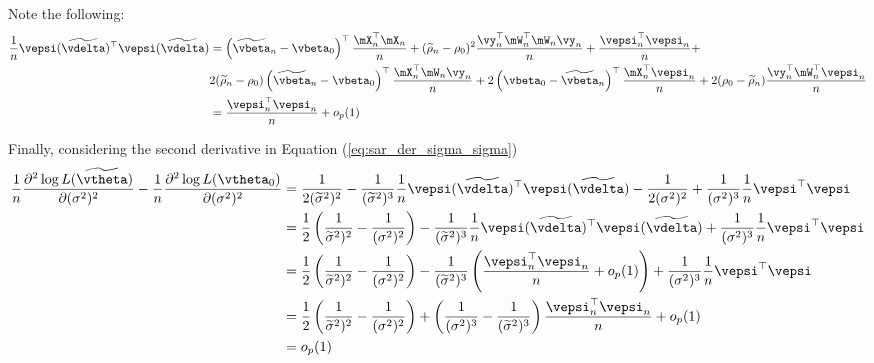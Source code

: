 \documentclass[english,12pt]{book}\usepackage[]{graphicx}\usepackage[]{xcolor}
\begin{document}
\begin{subappendices}
\begin{enumerate}
    Note the following:
   \begin{equation*}
    \begin{aligned}
    \frac{1}{n}\vepsi(\widetilde{\vdelta})^\top \vepsi(\widetilde{\vdelta}) & = \left(\widetilde{\vbeta}_n - \vbeta_0\right)^\top\frac{\mX_n^\top\mX_n}{n} + (\widetilde{\rho}_n -\rho_0)^2\frac{\vy_n^\top\mW_n^\top\mW_n\vy_n}{n} + \frac{\vepsi_n^{\top}\vepsi_n}{n} + \\
    & 2(\widetilde{\rho}_n -\rho_0)\left(\widetilde{\vbeta}_n - \vbeta_0\right)^\top\frac{\mX_n^\top\mW_n\vy_n}{n} + 2\left(\vbeta_0-\widetilde{\vbeta}_n\right)^\top\frac{\mX_n^\top\vepsi_n}{n} + 2(\rho_0-\widetilde{\rho}_n)\frac{\vy_n^\top\mW_n^\top\vepsi_n}{n} \\
    & = \frac{\vepsi_n^{\top}\vepsi_n}{n} + o_p(1)
    \end{aligned}
   \end{equation*}
   
   
   Finally, considering the second derivative in Equation (\ref{eq:sar_der_sigma_sigma})
   \begin{equation*}
    \begin{aligned}
      \frac{1}{n}\frac{\partial^2 \log L(\widetilde{\vtheta})}{\partial (\sigma^2)^2} -	\frac{1}{n}\frac{\partial^2 \log L(\vtheta_0)}{\partial (\sigma^2)^2}  & = \frac{1}{2(\widetilde{\sigma}^2) ^2} - \frac{1}{(\widetilde{\sigma}^2)^3} \frac{1}{n}\vepsi(\widetilde{\vdelta})^\top \vepsi(\widetilde{\vdelta}) -\frac{1}{2(\sigma^2) ^2} + \frac{1}{(\sigma^2)^3} \frac{1}{n}\vepsi^\top \vepsi \\
      & = \frac{1}{2}\left(\frac{1}{\widetilde{\sigma}^2) ^2}-\frac{1}{(\sigma^2) ^2}\right)- \frac{1}{(\widetilde{\sigma}^2)^3} \frac{1}{n}\vepsi(\widetilde{\vdelta})^\top \vepsi(\widetilde{\vdelta}) + \frac{1}{(\sigma^2)^3} \frac{1}{n}\vepsi^\top \vepsi \\
      & = \frac{1}{2}\left(\frac{1}{\widetilde{\sigma}^2) ^2}-\frac{1}{(\sigma^2) ^2}\right)- \frac{1}{(\widetilde{\sigma}^2)^3} \left(\frac{\vepsi_n^{\top}\vepsi_n}{n} + o_p(1)\right)+ \frac{1}{(\sigma^2)^3} \frac{1}{n}\vepsi^\top \vepsi \\
      & = \frac{1}{2}\left(\frac{1}{\widetilde{\sigma}^2) ^2}-\frac{1}{(\sigma^2) ^2}\right)+ \left(\frac{1}{(\sigma^2)^3} -\frac{1}{(\widetilde{\sigma}^2)^3}\right)\frac{\vepsi_n^{\top}\vepsi_n}{n} + o_p(1) \\
      & = o_p(1)
    \end{aligned}
   \end{equation*}
   


\end{enumerate}
\end{subappendices}
\end{document}
